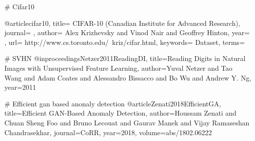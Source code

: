 # Cifar10

@article{cifar10,
title= {CIFAR-10 (Canadian Institute for Advanced Research)},
journal= {},
author= {Alex Krizhevsky and Vinod Nair and Geoffrey Hinton},
year= {},
url= {http://www.cs.toronto.edu/~kriz/cifar.html},
keywords= {Dataset},
terms= {}
}

# SVHN
@inproceedings{Netzer2011ReadingDI,
  title={Reading Digits in Natural Images with Unsupervised Feature Learning},
  author={Yuval Netzer and Tao Wang and Adam Coates and Alessandro Bissacco and Bo Wu and Andrew Y. Ng},
  year={2011}
}

# Efficient gan based anonaly detection
@article{Zenati2018EfficientGA,
  title={Efficient GAN-Based Anomaly Detection},
  author={Houssam Zenati and Chuan Sheng Foo and Bruno Lecouat and Gaurav Manek and Vijay Ramaseshan Chandrasekhar},
  journal={CoRR},
  year={2018},
  volume={abs/1802.06222}
}